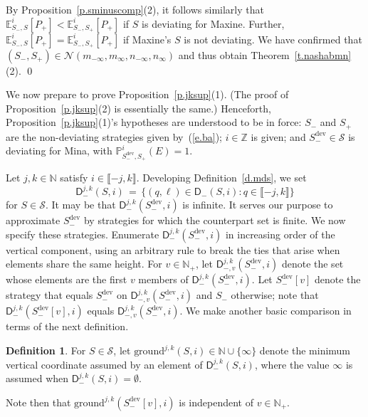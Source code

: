 \documentclass[letterpaper,11pt,oneside,reqno]{amsbook}
\newcommand{\PP}{\ensuremath{\mathbb{P}}}
\newcommand{\N}{\ensuremath{\mathbb{N}}}
\newcommand{\Z}{\ensuremath{\mathbb{Z}}}
\newcommand{\E}[0]{\mathbb{E}}
\numberwithin{figure}{chapter}
\theoremstyle{definition}
\theoremstyle{definition}
\theoremstyle{definition}
\newtheorem{definition}[theorem]{Definition}
\theoremstyle{definition}
\theoremstyle{definition}
\newcommand{\mc}{\mathcal}
\newcommand{\nwithzero}{\N}
\newcommand{\nwithoutzero}{\N_+}
\newcommand\egameplay[3]{\E^{#3}_{#1,#2}}
\newcommand{\ground}{\textrm{ground}}
\newcommand{\sdev}{S_-^{\textrm{dev}}}
\begin{document}
By Proposition~\ref{p.sminuscomp}(2), it follows similarly that
$\egameplay{S_-}{S}{i} [P_+] < \egameplay{S_-}{S_+}{i} [P_+]$ if $S$ is deviating for Maxine.
Further, $\egameplay{S_-}{S}{i} [P_+] = \egameplay{S_-}{S_+}{i} [P_+]$ if Maxine's $S$ is not deviating. 
We have confirmed that $(S_-,S_+) \in \mc{N}(m_{-\infty},m_\infty,n_{-\infty},n_\infty)$ and thus obtain Theorem~\ref{t.nashabmn}(2). \qed


We now prepare to prove Proposition~\ref{p.jksup}(1). 
(The proof of  Proposition~\ref{p.jksup}(2) is essentially the same.)
 Henceforth,  Proposition~\ref{p.jksup}(1)'s hypotheses are understood to be in force: $S_-$ and $S_+$ are the non-deviating strategies given by~(\ref{e.ba});
  $i \in \Z$ is given; and $\sdev \in \mc{S}$ is deviating for Mina, with $\PP_{\sdev,S_+}^i(E) = 1$.

Let $j,k \in \nwithzero$ satisfy $i \in \llbracket -j,k \rrbracket$. Developing Definition~\ref{d.mds}, we
set
$$
\mathsf{D}_-^{j,k}(S,i) \, = \, \Big\{ (q,\ell) \in \mathsf{D}_-(S,i): q \in \llbracket -j,k \rrbracket \Big\} 
$$
for $S \in \mc{S}$.
It may be that $\mathsf{D}_-^{j,k}(\sdev,i)$ is infinite. 
It serves our purpose to approximate $\sdev$ by strategies for which the counterpart set is finite. We now specify these strategies.
Enumerate  $\mathsf{D}_-^{j,k}(\sdev,i)$ in increasing order of the vertical component, using an arbitrary rule to break the ties that arise when elements share the same height.
For $v \in \nwithoutzero$, let  $\mathsf{D}_{-,v}^{j,k}(\sdev,i)$ denote the set whose elements are the first $v$ members of  $\mathsf{D}_-^{j,k}(\sdev,i)$. 
Let $\sdev[v]$ denote the strategy that equals $\sdev$ on $\mathsf{D}_{-,v}^{j,k}(\sdev,i)$ and $S_-$ otherwise; note that $\mathsf{D}_{-}^{j,k}(\sdev[v],i)$ equals $\mathsf{D}_{-,v}^{j,k}(\sdev,i)$.
We make another basic comparison in terms of the next definition.
\begin{definition}\label{d.ground}
For $S \in \mc{S}$,  let $\ground^{j,k}(S,i) \in \nwithzero \cup \{ \infty\}$ denote  the minimum vertical coordinate assumed by an element of $\mathsf{D}_-^{j,k}(S,i)$, where the value $\infty$ is assumed when  $\mathsf{D}_-^{j,k}(S,i) =  \emptyset$.
\end{definition}
Note then that $\ground^{j,k}(\sdev[v],i)$  is independent of $v \in \nwithoutzero$. 
\end{document}
